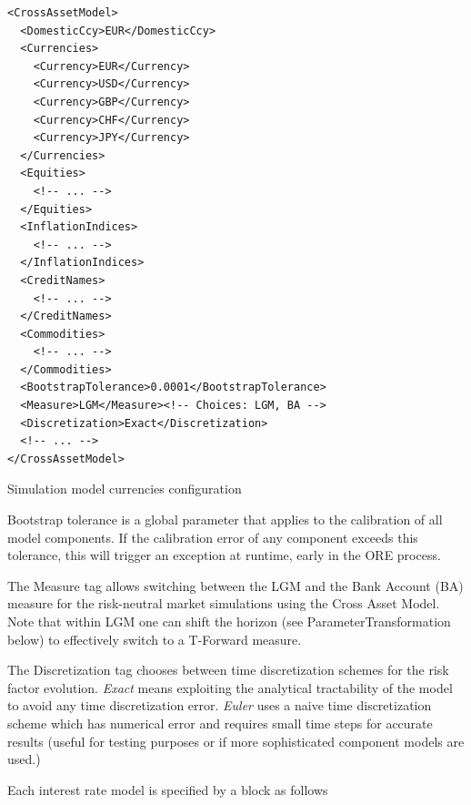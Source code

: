 \documentclass[12pt, a4paper]{article}
\begin{document}
{\begin{listing}[H]
\begin{verbatim}
<CrossAssetModel>
  <DomesticCcy>EUR</DomesticCcy>
  <Currencies>
    <Currency>EUR</Currency>
    <Currency>USD</Currency>
    <Currency>GBP</Currency>
    <Currency>CHF</Currency>
    <Currency>JPY</Currency>
  </Currencies>
  <Equities>
	<!-- ... -->
  </Equities>
  <InflationIndices>
	<!-- ... -->
  </InflationIndices>
  <CreditNames>
	<!-- ... -->
  </CreditNames>
  <Commodities>
	<!-- ... -->
  </Commodities>
  <BootstrapTolerance>0.0001</BootstrapTolerance>
  <Measure>LGM</Measure><!-- Choices: LGM, BA -->
  <Discretization>Exact</Discretization>
  <!-- ... -->
</CrossAssetModel>
\end{verbatim}
\caption{Simulation model currencies configuration}
\label{lst:simulation_model_currencies_configuration}
\end{listing}
 
Bootstrap tolerance is a global parameter that applies to the calibration of all model components. If the calibration
error of any component exceeds this tolerance, this will trigger an exception at runtime, early in the ORE process.

The Measure tag allows switching between the LGM and the Bank Account (BA) measure for the risk-neutral market simulations using the Cross Asset Model. Note that within LGM one can shift the horizon (see ParameterTransformation below) to effectively switch to a T-Forward measure.

The Discretization tag chooses between time discretization schemes for the risk factor evolution. {\em Exact} means
exploiting the analytical tractability of the model to avoid any time discretization error. {\em Euler} uses a naive
time discretization scheme which has numerical error and requires small time steps for accurate results (useful for
testing purposes or if more sophisticated component models are used.)
 
\medskip

Each interest rate model is specified by a block as follows

}
\end{document}
